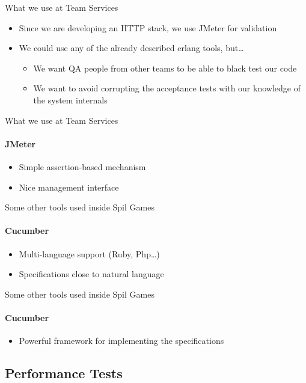 \documentclass[]{beamer}
\begin{document}
\begin{frame}{What we use at Team Services}
    \begin{itemize}
    \item Since we are developing an HTTP stack, we use JMeter for validation
    \pause
    \item We could use any of the already described erlang tools, but\dots
    \pause
        \begin{itemize}
        \item We want QA people from other teams to be able to black test our code
        \item We want to avoid corrupting the acceptance tests with our knowledge of the system internals
        \end{itemize}
    \end{itemize}
\end{frame}

\begin{frame}{What we use at Team Services}
    \framesubtitle{JMeter}
    \begin{itemize}
    \item Simple assertion-based mechanism
    \item Nice management interface
    \end{itemize}
\end{frame}

\begin{frame}{Some other tools used inside Spil Games}
    \framesubtitle{Cucumber}
    \begin{itemize}
    \item Multi-language support (Ruby, Php\dots)
    \item Specifications close to natural language
        
    \end{itemize}
\end{frame}

\begin{frame}{Some other tools used inside Spil Games}
    \framesubtitle{Cucumber}
    \begin{itemize}
    \item Powerful framework for implementing the specifications
        
    \end{itemize}
\end{frame}

\subsection*{Performance Tests}
\label{performance_tests}
\end{document}
